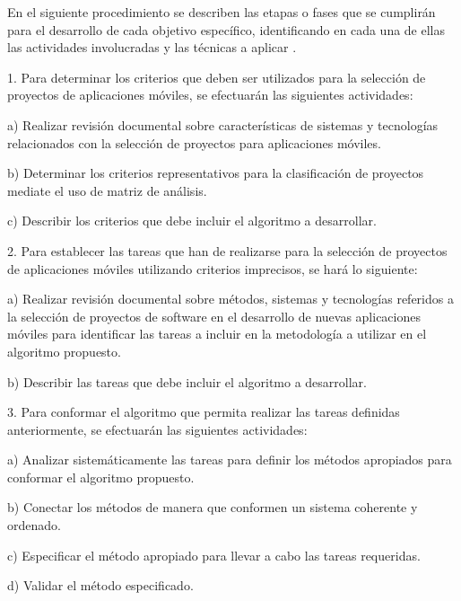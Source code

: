 En el siguiente procedimiento se describen las etapas o fases que se cumplirán para el desarrollo de cada objetivo específico, identificando en cada una de ellas las actividades involucradas y las técnicas a aplicar \cite[p. 11]{UNEXPOmanual2004}.
\begin{enumeracion}
\item[1. ]Para determinar los criterios que deben ser utilizados para la selección de proyectos de aplicaciones  móviles, se efectuarán las siguientes actividades:
\begin{enumeracion}
	\item[a) ] Realizar revisión documental sobre características de sistemas y tecnologías relacionados con la selección de proyectos para aplicaciones móviles.
	\item[b) ] Determinar los criterios representativos para la clasificación de proyectos mediate el uso de matriz de análisis. 
	\item[c) ] Describir los criterios que debe incluir el algoritmo a desarrollar.
\end{enumeracion}
\item[2. ] Para establecer las tareas que han de realizarse para la selección de proyectos de aplicaciones móviles utilizando criterios imprecisos, se hará lo siguiente:
\begin{enumeracion}
	\item[a) ]  Realizar revisión documental sobre métodos, sistemas y tecnologías 	referidos a la selección de proyectos de software en el desarrollo de nuevas aplicaciones móviles para identificar las tareas a incluir en la metodología a utilizar en el algoritmo propuesto.
	\item[b) ]  Describir las tareas que debe incluir el algoritmo a desarrollar.

\end{enumeracion}
\item[3. ]Para conformar el algoritmo que permita realizar las tareas definidas anteriormente, se efectuarán las siguientes actividades:
\begin{enumeracion}
	\item[a) ] Analizar sistemáticamente las tareas para definir los métodos apropiados para conformar el algoritmo propuesto. 
	\item[b) ] Conectar los métodos de manera que conformen un sistema coherente y ordenado. 
	\item[c) ] Especificar el método apropiado para llevar a cabo las tareas requeridas.
	\item[d) ] Validar el método especificado.
\end{enumeracion}


\end{enumeracion}
